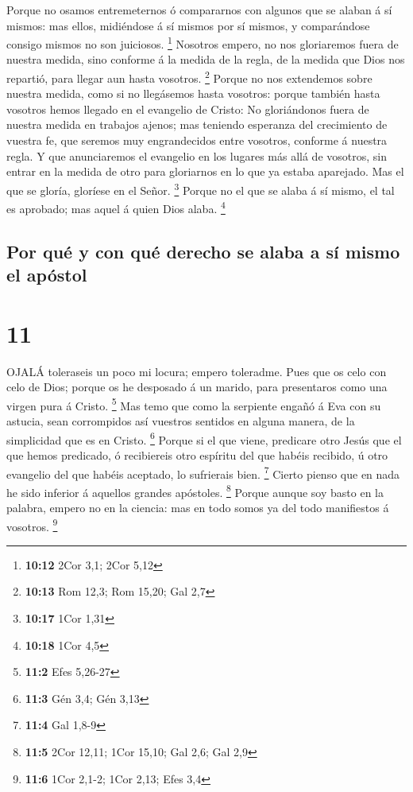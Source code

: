  Porque no osamos entremeternos ó compararnos con algunos
que se alaban á sí mismos: mas ellos, midiéndose á sí mismos por sí
mismos, y comparándose consigo mismos no son juiciosos. \footnote{\textbf{10:12}
  2Cor 3,1; 2Cor 5,12}  Nosotros empero, no nos gloriaremos
fuera de nuestra medida, sino conforme á la medida de la regla, de la
medida que Dios nos repartió, para llegar aun hasta vosotros.
\footnote{\textbf{10:13} Rom 12,3; Rom 15,20; Gal 2,7} 
Porque no nos extendemos sobre nuestra medida, como si no llegásemos
hasta vosotros: porque también hasta vosotros hemos llegado en el
evangelio de Cristo:  No gloriándonos fuera de nuestra
medida en trabajos ajenos; mas teniendo esperanza del crecimiento de
vuestra fe, que seremos muy engrandecidos entre vosotros, conforme á
nuestra regla.  Y que anunciaremos el evangelio en los
lugares más allá de vosotros, sin entrar en la medida de otro para
gloriarnos en lo que ya estaba aparejado.  Mas el que se
gloría, gloríese en el Señor. \footnote{\textbf{10:17} 1Cor 1,31}
 Porque no el que se alaba á sí mismo, el tal es aprobado;
mas aquel á quien Dios alaba. \footnote{\textbf{10:18} 1Cor 4,5}

\hypertarget{por-quuxe9-y-con-quuxe9-derecho-se-alaba-a-suxed-mismo-el-apuxf3stol}{%
\subsection{Por qué y con qué derecho se alaba a sí mismo el
apóstol}\label{por-quuxe9-y-con-quuxe9-derecho-se-alaba-a-suxed-mismo-el-apuxf3stol}}

\hypertarget{section-10}{%
\section{11}\label{section-10}}

 OJALÁ toleraseis un poco mi locura; empero toleradme.
 Pues que os celo con celo de Dios; porque os he desposado á
un marido, para presentaros como una virgen pura á Cristo. \footnote{\textbf{11:2}
  Efes 5,26-27}  Mas temo que como la serpiente engañó á Eva
con su astucia, sean corrompidos así vuestros sentidos en alguna manera,
de la simplicidad que es en Cristo. \footnote{\textbf{11:3} Gén 3,4; Gén
  3,13}  Porque si el que viene, predicare otro Jesús que el
que hemos predicado, ó recibiereis otro espíritu del que habéis
recibido, ú otro evangelio del que habéis aceptado, lo sufrierais bien.
\footnote{\textbf{11:4} Gal 1,8-9}  Cierto pienso que en
nada he sido inferior á aquellos grandes apóstoles. \footnote{\textbf{11:5}
  2Cor 12,11; 1Cor 15,10; Gal 2,6; Gal 2,9}  Porque aunque
soy basto en la palabra, empero no en la ciencia: mas en todo somos ya
del todo manifiestos á vosotros. \footnote{\textbf{11:6} 1Cor 2,1-2;
  1Cor 2,13; Efes 3,4}

